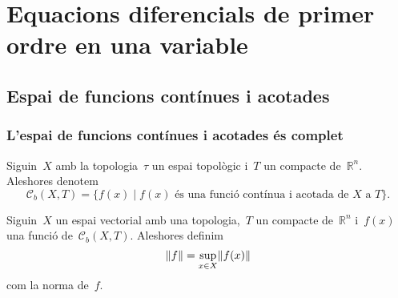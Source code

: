 \documentclass[../equacions-diferencials-I.tex]{subfiles}
\begin{document}
\chapter{Equacions diferencials de primer ordre en una variable}
\section{Espai de funcions contínues i acotades}
    \subsection{L'espai de funcions contínues i acotades és complet}
    \begin{notation}
        \label{notation:espai-de-funcions-continues-i-acotades}
        Siguin~\(X\) amb la topologia~\(\tau\) un espai topològic i~\(T\) un compacte de~\(\mathbb{R}^{n}\).
        Aleshores denotem
        \[
            \mathcal{C}_{b}(X,T)=\{f(x)\mid f(x)\text{ és una funció contínua i acotada de }X\text{ a }T\}.
        \]
    \end{notation}
    \begin{definition}
        \label{def:norma-duna-funcio}
        Siguin~\(X\) un espai vectorial amb una topologia,~\(T\) un compacte de~\(\mathbb{R}^{n}\) i~\(f(x)\) una funció de~\(\mathcal{C}_{b}(X,T)\).
        Aleshores definim
        \[
            \norm{f}=\sup_{x\in X}\norm{f(x)}
        \]
        com la norma de~\(f\).
    \end{definition}
\end{document}
